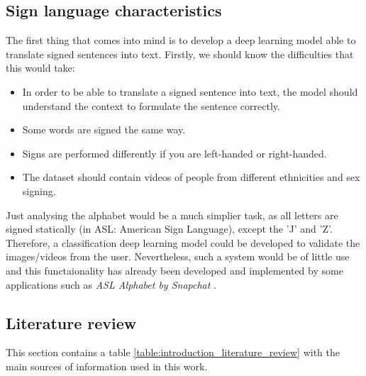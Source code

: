 \subsection{Sign language characteristics}
The first thing that comes into mind is to develop a deep learning model able to translate signed sentences into 
text. Firstly, we should know the difficulties that this would take:
\begin{itemize}[noitemsep]
    \item In order to be able to translate a signed sentence into text, the model should understand the context to formulate the sentence correctly.
    \item Some words are signed the same way.
    \item Signs are performed differently if you are left-handed or right-handed.
    \item The dataset should contain videos of people from different ethnicities and sex signing.
\end{itemize}

Just analysing the alphabet would be a much simplier task, as all letters are signed statically (in ASL: American Sign Language), except the 'J' and 'Z'.
Therefore, a classification deep learning model could be developed to validate the images/videos from the user.
Nevertheless, such a system would be of little use and this functaionality has already been developed and implemented by some applications such as \textit{ASL Alphabet by Snapchat} \cite{Snapchat}.

\subsection{Literature review}
This section contains a table \ref{table:introduction_literature_review} with the main sources of information used in this work. \\

